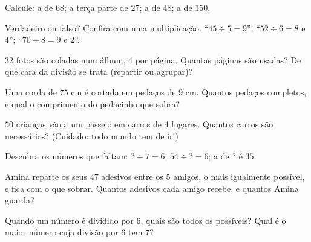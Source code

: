 \begin{exercise}[$\star$]\label{exo:g3:division:4}
Calcule: a  de $68$; a terça parte de $27$; a  de
$48$; a  de $150$.
\end{exercise}

\begin{exercise}[$\star$]\label{exo:g3:division:5}
Verdadeiro ou falso? Confira com uma multiplicação.
``$45 \div 5 = 9$''; \quad ``$52 \div 6 = 8$ e  $4$'';
\quad ``$70 \div 8 = 9$ e  $2$''.
\end{exercise}

\begin{exercise}[$\star$]\label{exo:g3:division:6}
$32$ fotos são coladas num álbum, $4$ por página. Quantas páginas são
usadas? De que cara da divisão se trata (repartir ou agrupar)?
\end{exercise}

\begin{exercise}[$\star$]\label{exo:g3:division:7}
Uma corda de $75$ cm é cortada em pedaços de $9$ cm. Quantos pedaços
completos, e qual o comprimento do pedacinho que sobra?
\end{exercise}

\begin{exercise}[$\star$]\label{exo:g3:division:8}
$50$ crianças vão a um passeio em carros de $4$ lugares. Quantos
carros são necessários? (Cuidado: todo mundo tem de ir!)
\end{exercise}

\begin{exercise}[$\star$]\label{exo:g3:division:9}
Descubra os números que faltam: $? \div 7 = 6$; \quad
$54 \div ? = 6$; \quad a  de $?$ é $35$.
\end{exercise}

\begin{exercise}[$\star\star$]\label{exo:g3:division:10}
Amina reparte os seus $47$ adesivos entre os $5$ amigos, o mais
igualmente possível, e fica com o que sobrar. Quantos adesivos cada
amigo recebe, e quantos Amina guarda?
\end{exercise}

\begin{exercise}[$\star\star$]\label{exo:g3:division:11}
Quando um número é dividido por $6$, quais são todos os 
possíveis? Qual é o maior número cuja divisão por $6$ tem 
$7$?
\end{exercise}
